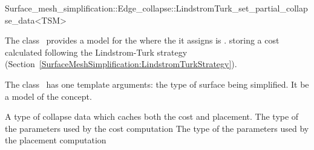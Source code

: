 

\begin{ccRefClass}{Surface_mesh_simplification::Edge_collapse::LindstromTurk_set_partial_collapse_data<TSM>}


\ccDefinition

The class \ccRefName\ provides a model for the
 where the  it assigns is .
storing a cost calculated following the Lindstrom-Turk strategy
(Section~\ref{SurfaceMeshSimplification:LindstromTurkStrategy}).

The class \ccRefName\ has one template arguments: the type of surface being simplified. 
It be a model of the  concept.

\ccIsModel
{}


\ccTypes
  \ccGlue
  \ccGlue
  {A type of collapse data which caches both the cost and placement.}
  \ccGlue
  {The type of the parameters used by the cost computation}
  \ccGlue
  {The type of the parameters used by the placement computation}
            
\ccCreation
{}  %


\end{ccRefClass}
